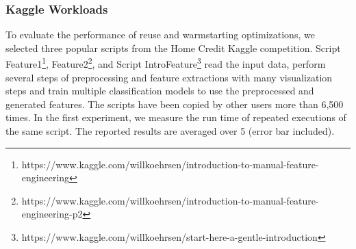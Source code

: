 \subsubsection{Kaggle Workloads}
To evaluate the performance of reuse and warmstarting optimizations, we selected three popular scripts from the Home Credit Kaggle competition.
Script Feature1\footnote{https://www.kaggle.com/willkoehrsen/introduction-to-manual-feature-engineering}, Feature2\footnote{https://www.kaggle.com/willkoehrsen/introduction-to-manual-feature-engineering-p2}, and Script IntroFeature\footnote{https://www.kaggle.com/willkoehrsen/start-here-a-gentle-introduction} read the input data, perform several steps of preprocessing and feature extractions with many visualization steps and train multiple classification models to use the preprocessed and generated features.
The scripts have been copied by other users more than 6,500 times.
In the first experiment, we measure the run time of repeated executions of the same script.
The reported results are averaged over 5 (error bar included).
